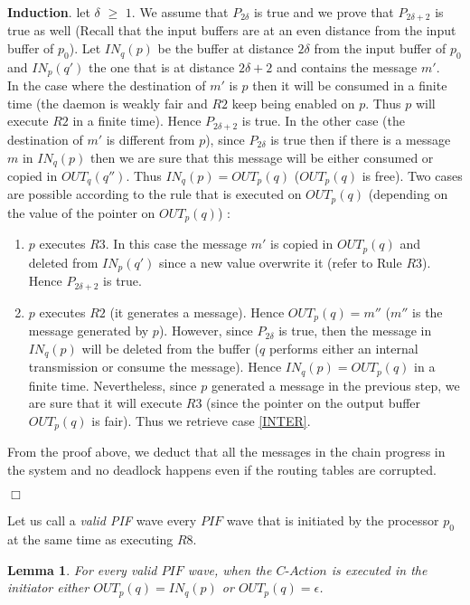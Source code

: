 \documentclass{llncs}
\renewenvironment{proof}{{\it Proof. } }{{\hfill $\Box$}\vspace{.5pc}}
\newtheorem{lem}{Lemma}
\begin{document}
\begin{proof}
\textbf{Induction}. let $\delta$ $\geq$ $1$. We assume that $P_{2\delta}$ is true and we prove that $P_{2\delta +2}$ is true as well (Recall that the input buffers are at an even distance from the input buffer of $p_{0}$). Let $IN_{q}(p)$ be the buffer at distance $2\delta$ from the input buffer of $p_{0}$ and $IN_{p}(q')$ the one that is at distance $2\delta+2$ and contains the message $m'$. \\
In the case where the destination of $m'$ is $p$ then it will be consumed in a finite time (the daemon is weakly fair and $R2$ keep being enabled on $p$. Thus $p$ will execute $R2$ in a finite time). Hence $P_{2\delta+2}$ is true. In the other case (the destination of $m'$ is different from $p$), since $P_{2\delta}$ is true then if there is a message $m$ in $IN_{q}(p)$ then we are sure that this message will be either consumed or copied in $OUT_{q}(q'')$. Thus $IN_{q}(p)=OUT_{p}(q)$ ($OUT_{p}(q)$ is free). Two cases are possible according to the rule that is executed on $OUT_{p}(q)$ (depending on the value of the pointer on $OUT_{p}(q)$) :
\begin{enumerate}
\item\label{INTER}{$p$ executes $R3$. In this case the message $m'$ is copied in $OUT_{p}(q)$ and deleted from $IN_{p}(q')$ since a new value overwrite it (refer to Rule $R3$). Hence $P_{2\delta+2}$ is true.}
\item{$p$ executes $R2$ (it generates a message). Hence $OUT_{p}(q)=m''$ ($m''$ is the message generated by $p$). However, since $P_{2\delta}$ is true, then the message in $IN_{q}(p)$ will be deleted from the buffer ($q$ performs either an internal transmission or consume the message). Hence $IN_{q}(p)=OUT_{p}(q)$ in a finite time. Nevertheless, since $p$ generated a message in the previous step, we are sure that it will execute $R3$ (since the pointer on the output buffer $OUT_{p}(q)$ is fair). Thus we retrieve case \ref{INTER}.}
\end{enumerate}

From the proof above, we deduct that all the messages in the chain progress in the system and no deadlock happens even if the routing tables are corrupted.

\end{proof}

Let us call a {\em valid PIF} wave every $PIF$ wave that is initiated by the processor $p_{0}$ at the same time as executing $R8$.

\begin{lem}\label{VPIF}
For every valid $PIF$ wave, when the $C\mbox{-}Action$ is executed in the initiator either $OUT_{p}(q)=IN_{q}(p)$ or $OUT_{p}(q)=\epsilon$. 
\end{lem}
\end{document}

